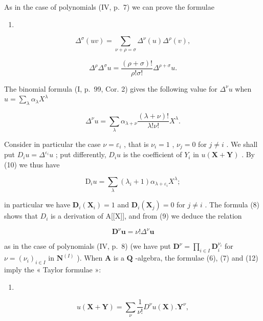 As in the case of polynomials (IV, p.~7) we can prove the formulae

\begin{enumerate}
\def\labelenumi{(\arabic{enumi})}
\setcounter{enumi}{7}
\tightlist
\item
\end{enumerate}

\[
\Delta^ {\sigma} (u v) = \sum_ {\nu + \rho = \sigma} \Delta^ {\nu} (u) \Delta^ {\rho} (v),
\]

\[
\Delta^ {\rho} \Delta^ {\sigma} u = \frac {(\rho + \sigma) !}{\rho ! \sigma !} \Delta^ {\rho + \sigma} u.\tag{9}
\]

The binomial formula (I, p.~99, Cor. 2) gives the following value for \(\Delta^{\nu}u\) when \(u = \sum_{\lambda} \alpha_{\lambda} X^{\lambda}\)

\[
\Delta^ {\nu} u = \sum_ {\lambda} \alpha_ {\lambda + \nu} \frac {(\lambda + \nu) !}{\lambda ! \nu !} X ^ {\lambda}.\tag{10}
\]

Consider in particular the case \(\nu = \varepsilon_{i}\) , that is \(\nu_{i} = 1\) , \(\nu_{j} = 0\) for \(j \neq i\) . We shall put \(D_{i}u = \Delta^{\varepsilon_{i}}u\) ; put differently, \(D_{i}u\) is the coefficient of \(Y_{i}\) in \(u(\mathbf{X} + \mathbf{Y})\) . By (10) we thus have

\[
\mathrm{D} _ {i} u = \sum_ {\lambda} (\lambda_ {i} + 1) \alpha_ {\lambda + \varepsilon_ {i}} X ^ {\lambda};\tag{11}
\]

in particular we have \(\mathbf{D}_{i}(\mathbf{X}_{i})=1\) and \(\mathbf{D}_{i}(\mathbf{X}_{j})=0\) for \(j\neq i\) . The formula (8) shows that \(D_{i}\) is a derivation of A{[}{[}X{]}{]}, and from (9) we deduce the relation

\[
\mathbf {D} ^ {\nu} \boldsymbol {u} = \nu ! \Delta^ {\nu} \boldsymbol {u}\tag{12}
\]

as in the case of polynomials (IV, p.~8) (we have put \(\mathbf{D}^{\nu} = \prod_{i\in I}\mathbf{D}_{i}^{\nu_{i}}\) for \(\nu = (\nu_{i})_{i\in I}\) in \(\mathbf{N}^{(I)}\) ). When \(\mathbf{A}\) is a \(\mathbf{Q}\) -algebra, the formulae (6), (7) and (12) imply the « Taylor formulae »:

\begin{enumerate}
\def\labelenumi{(\arabic{enumi})}
\setcounter{enumi}{12}
\tightlist
\item
\end{enumerate}

\[
u (\mathbf {X} + \mathbf {Y}) = \sum_ {\nu} \frac {1}{\nu !} D ^ {\nu} u (\mathbf {X}). \mathbf {Y} ^ {\nu},
\]

